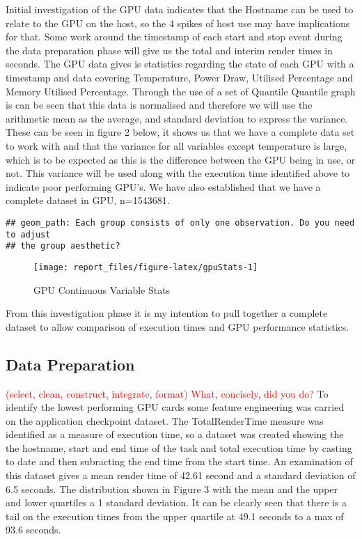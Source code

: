 \documentclass[
  twocolumn]{article}
\begin{document}
Initial investigation of the GPU data indicates that the Hostname can be
used to relate to the GPU on the host, so the 4 spikes of host use may
have implications for that. Some work around the timestamp of each start
and stop event during the data preparation phase will give us the total
and interim render times in seconds. The GPU data gives is statistics
regarding the state of each GPU with a timestamp and data covering
Temperature, Power Draw, Utilised Percentage and Memory Utilised
Percentage. Through the use of a set of Quantile Quantile graph is can
be seen that this data is normalised and therefore we will use the
arithmetic mean as the average, and standard deviation to express the
variance. These can be seen in figure 2 below, it shows us that we have
a complete data set to work with and that the variance for all variables
except temperature is large, which is to be expected as this is the
difference between the GPU being in use, or not. This variance will be
used along with the execution time identified above to indicate poor
performing GPU's. We have also established that we have a complete
dataset in GPU, n=1543681.

\begin{verbatim}
## geom_path: Each group consists of only one observation. Do you need to adjust
## the group aesthetic?
\end{verbatim}

\begin{figure}
\texttt{[image: report\_files/figure-latex/gpuStats-1]} \caption{GPU Continuous Variable Stats}\label{fig:gpuStats}
\end{figure}

From this investigation phase it is my intention to pull together a
complete dataset to allow comparison of execution times and GPU
performance statistics.

\hypertarget{data-preparation}{%
\subsection{Data Preparation}\label{data-preparation}}

\textcolor{red}{(select, clean, construct, integrate, format)}
\textcolor{red}{What, concisely, did you do?} To identify the lowest
performing GPU cards some feature engineering was carried on the
application checkpoint dataset. The TotalRenderTime measure was
identified as a measure of execution time, so a dataset was created
showing the the hostname, start and end time of the task and total
execution time by casting to date and then subracting the end time from
the start time. An examination of this dataset gives a mean render time
of 42.61 second and a standard deviation of 6.5 seconds. The
distribution shown in Figure 3 with the mean and the upper and lower
quartiles a 1 standard deviation. It can be clearly seen that there is a
tail on the execution times from the upper quartile at 49.1 seconds to a
max of 93.6 seconds.
\end{document}
